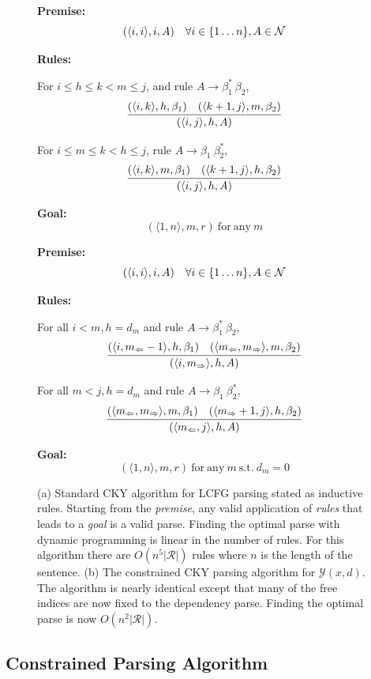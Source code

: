 \documentclass[11pt,letterpaper]{article}
\newcommand{\rules}{\mathcal{R}}
\newcommand{\Left}[1]{#1_{\Leftarrow}}
\newcommand{\Right}[1]{#1_{\Rightarrow}}
\newcommand{\Span}[1]{\langle #1 \rangle}
\newcommand{\tri}{\langle \Left{m}, \Right{m} \rangle}
\newcommand{\Root}{r}
\newcommand{\RuleA}[3]{#1 \rightarrow #2^*\ #3}
\newcommand{\RuleB}[3]{#1 \rightarrow #2\ #3^*}
\begin{document}
\begin{figure}
  \begin{multicols}{2}
  \noindent \textbf{Premise:}
  \[(\Span{i, i}, i, A)\ \ \ \forall i \in \{1 \ldots n\}, A \in {\cal N}\]

  \noindent\textbf{Rules:}

   For $i\leq h \leq k < m \leq j$,  and  rule  $\RuleA{A}{\beta_1}{\beta_2}$,
   \[\infer{( \Span{i, j},  h,  A)}{( \Span{i, k}, h, \beta_1)  &  ( \Span{k+1, j}, m, \beta_2) } \]

   For $i\leq m \leq k < h \leq j$, rule  $\RuleB{A}{\beta_1}{\beta_2}$,
   \[\infer{(\Span{i, j},  h, A)}{(\Span{i, k}, m, \beta_1)  &  (\Span{k+1, j}, h, \beta_2) }  \]

\noindent \textbf{Goal:}
\[ (\Span{1, n}, m, \Root) \mathrm{\ for\ any }\ m\]

\label{fig:cky}

  \noindent \textbf{Premise:}
  \[(\langle i,i \rangle, i, A)\ \ \ \forall i \in \{1 \ldots n\}, A \in {\cal N}\]

  \noindent\textbf{Rules:}

  For all   $i < m, h = d_m$  and rule  $\RuleA{A}{\beta_1}{\beta_2}$,
  \[\infer{( \Span{i, \Right{m}}, h, A)}{(\Span{i, \Left{m}-1}, h, \beta_1)  &  (\tri, m, \beta_2) } \]

  For all    $m < j, h = d_m$ and  rule  $\RuleB{A}{\beta_1}{\beta_2}$,
  \[ \infer{( \Span{ \Left{m}, j }, h, A)}{(\tri, m, \beta_1)  &  (\Span{\Right{m}+ 1, j}, h, \beta_2) } \]

\noindent \textbf{Goal:}
\[(\Span{1, n}, m, \Root) \mathrm{\ for\ any }\ m \mathrm{\ s.t. \ } d_m = 0 \]

\end{multicols}
\label{fig:cky_new}
\caption{(a) Standard CKY algorithm for LCFG parsing stated as inductive rules. Starting from the \textit{premise}, any valid application of \textit{rules} that leads to a \textit{goal} is a valid parse. Finding the optimal parse with dynamic programming is linear in the number of rules. For this algorithm there are $O(n^5|\rules|)$ rules where $n$ is the length of the sentence. (b) The constrained CKY parsing algorithm for $\mathcal{Y}(x, d)$. The algorithm is nearly identical except that many of the free indices are now fixed to the dependency parse. Finding the optimal parse is now $O(n^2|\rules|)$.}
\end{figure}

\subsection{Constrained Parsing Algorithm}
\end{document}
